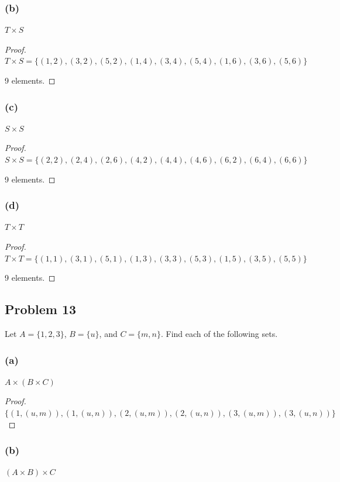 \documentclass[14pt]{extarticle}
\begin{document}
\subsubsection{(b)}
$T \times S$

\begin{proof}
    $T \times S = \{(1, 2), (3, 2), (5, 2), (1, 4), (3, 4), (5, 4), (1, 6), (3, 6),
        (5, 6)\}$

    9 elements.
\end{proof}

\subsubsection{(c)}
$S \times S$

\begin{proof}
    $S \times S = \{(2, 2), (2, 4), (2, 6), (4, 2), (4, 4), (4, 6), (6, 2), (6, 4),
        (6, 6)\}$

    9 elements.
\end{proof}

\subsubsection{(d)}
$T \times T$

\begin{proof}
    $T \times T = \{(1, 1), (3, 1), (5, 1), (1, 3), (3, 3), (5, 3), (1, 5), (3, 5),
        (5, 5)\}$

    9 elements.
\end{proof}

\subsection{Problem 13}
Let $A = \{1, 2, 3\}$, $B = \{u\}$, and $C = \{m, n\}$. Find each of the
following sets.

\subsubsection{(a)}
$A \times (B \times C)$

\begin{proof}
    $\{(1, (u, m)), (1, (u, n)), (2, (u, m)), (2, (u, n)),
        (3, (u, m)), (3, (u, n))\}$
\end{proof}

\subsubsection{(b)}
$(A \times B) \times C$
\end{document}
